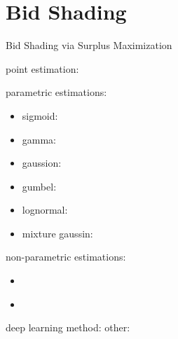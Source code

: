 \documentclass[../main.tex]{subfiles}
\begin{document}
	\chapter{Bid Shading}
	
	
\begin{section} {Bid Shading via Surplus Maximization}
	
	point estimation:  \cite{gligorijevic2020bid}
	
	parametric estimations:
	\begin{itemize}
		\item sigmoid:  \cite{pan2020bid}
		\item gamma: \cite{zhu2017gamma}
		\item gaussion: \cite{wu2015predicting}
		\item gumbel: \cite{wu2018deep}
		\item lognormal: \cite{zhou2021efficient}
		\item mixture gaussin: \cite{ghosh2019scalable}
	\end{itemize}

	non-parametric estimations:
	\begin{itemize}
		\item \cite{kaplan1958nonparametric}
		\item \cite{zhang2021meow}
	\end{itemize}

deep learning method: \cite{ren2019deep}
other: \cite{xu2024simultaneous}
\end{section}
	
\end{document}
